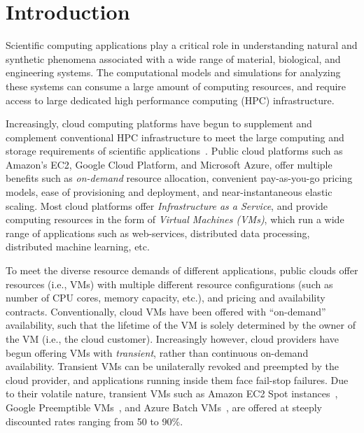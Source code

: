 \section{Introduction}


Scientific computing applications play a critical role in understanding natural and synthetic phenomena associated with a wide range of material, biological, and engineering systems. 
The computational models and simulations for analyzing these systems can consume a large amount of computing resources, and require access to large dedicated high performance computing (HPC) infrastructure. 







Increasingly, cloud computing platforms have begun to supplement and complement conventional HPC infrastructure  to meet the large computing and storage requirements of scientific applications~\cite{buyya-hpc-survey}. 
Public cloud platforms such as Amazon's EC2, Google Cloud Platform, and Microsoft Azure, offer multiple benefits such as \emph{on-demand} resource allocation, convenient pay-as-you-go pricing models, ease of provisioning and deployment, and near-instantaneous elastic scaling. 
Most cloud platforms offer \emph{Infrastructure as a Service}, and provide computing resources in the form of \emph{Virtual Machines (VMs)},  which run a wide range of applications such as web-services, distributed data processing, distributed machine learning, etc.



To meet the diverse resource demands of different applications, public clouds offer resources (i.e., VMs) with multiple different resource configurations (such as number of CPU cores,  memory capacity, etc.), and pricing and availability contracts. 
Conventionally, cloud VMs have been offered with ``on-demand'' availability, such that the lifetime of the VM is solely determined by the owner of the VM (i.e., the cloud customer). 
Increasingly however, cloud providers have begun offering VMs with \emph{transient}, rather than continuous on-demand availability. 
Transient VMs can be unilaterally revoked and preempted by the cloud provider, and applications running inside them face fail-stop failures. 
Due to their volatile nature, transient VMs such as Amazon EC2 Spot instances~\cite{spot-documentation}, Google Preemptible VMs~\cite{preemptible-documentation}, and Azure Batch VMs~\cite{azure-batch}, are offered at steeply discounted rates ranging from 50 to 90\%.

